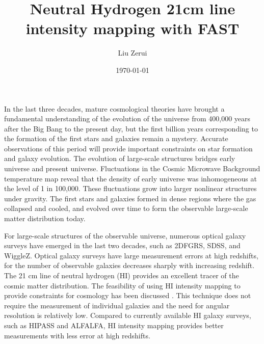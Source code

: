 \documentclass{article}
\title{Neutral Hydrogen 21cm line intensity mapping with FAST}
\author{Liu Zerui}
\date{\today}
\begin{document}
\maketitle

In the last three decades, mature cosmological theories have brought a fundamental understanding of the evolution of the universe from 400,000 years after the Big Bang to the present day, but the first billion years corresponding to the formation of the first stars and galaxies remain a mystery. Accurate observations of this period will provide important constraints on star formation and galaxy evolution. The evolution of large-scale structures bridges early universe and present universe. Fluctuations in the Cosmic Microwave Background temperature map reveal that the density of early universe was inhomogeneous at the level of 1 in 100,000. These fluctuations grow into larger nonlinear structures under gravity. The first stars and galaxies formed in dense regions where the gas collapsed and cooled, and evolved over time to form the observable large-scale matter distribution today\cite{Pritchard_2012}\cite{Penzias_1965}\cite{Weinberg_2013}.

For large-scale structures of the observable universe, numerous optical galaxy surveys have emerged in the last two decades, such as 2DFGRS\cite{Percival_2001}, SDSS\cite{gunn_1995}\cite{Tegmark_1997}\cite{Schlegel_2009}, and WiggleZ\cite{Glazebrook_2007}\cite{Drinkwater_2010}. Optical galaxy surveys have large measurement errors at high redshifts, for the number of observable galaxies decreases sharply with increasing redshift\cite{Eisenstein_2005}\cite{Percival_2010}. The 21 cm line of neutral hydrogen (HI) provides an excellent tracer of the cosmic matter distribution. The feasibility of using HI intensity mapping to provide constraints for cosmology has been discussed\cite{Chang2008} \cite{Datta_2022}\cite{2022arXiv221012164B}. This technique does not require the measurement of individual galaxies and the need for angular resolution is relatively low. Compared to currently available HI galaxy surveys, such as HIPASS\cite{Meyer_2004} and ALFALFA\cite{Saintonge_2007}, HI intensity mapping provides better measurements with less error at high redshifts\cite{Hu_2020}. 
\end{document}
